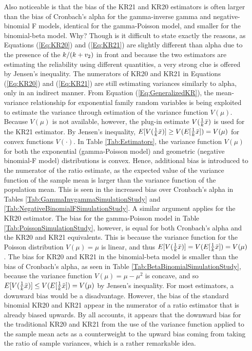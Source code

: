 \documentclass[12pt,epsfig]{article}
\newcommand{\changed}[1]{\textcolor{black}{#1}}
\newcommand{\testlength}{\changed{k}}%
\begin{document}
Also noticeable is that the bias of the KR21 and KR20 estimators is often larger than the bias of Cronbach's alpha for the gamma-inverse gamma and negative-binomial F models, identical for the gamma-Poisson model, and smaller for the binomial-beta model. Why? Though is it difficult to state exactly the reasons, as Equations (\ref{Eq:KR20}) and (\ref{Eq:KR21}) are slightly different than alpha due to the presence of the $\testlength/(\testlength + v_2)$ in front and because the two estimators are estimating the reliability using different quantities, a very strong clue is offered by Jensen's inequality. The numerators of KR20 and KR21 in Equations (\ref{Eq:KR20}) and (\ref{Eq:KR21}) are still estimating variances similarly to alpha, only in an indirect manner. From Equation (\ref{Eq:GeneralizedKR}), the mean-variance relationship for exponential family random variables is being exploited to estimate the variance through estimation of the variance function $V(\mu)$. Because $V(\mu)$ is not available, however, the plug-in estimate $V(\frac{1}{\testlength} \bar{x})$ is used for the KR21 estimator. By Jensen's inequality, $E[V(\frac{1}{\testlength} \bar{x})] \ge V(E[\frac{1}{\testlength} \bar{x}]) = V(\mu)$ for convex functions $V(\cdot)$. In Table \ref{Tab:Estimators}, the variance function $V(\mu)$ for both the exponential (gamma-Poisson model) and geometric (negative binomial-F model) distributions is convex. Hence, additional bias is introduced to the numerator of the ratio estimate, as the expected value of the variance function of the sample mean is larger than the variance function of the population mean. This is seen in the increased bias over Cronbach's alpha in Tables \ref{Tab:GammaInvgammaSimulationStudy} and \ref{Tab:NegativeBinomialFSimulationStudy}. A similar argument applies for the KR20 estimator.  The bias for the gamma-Poisson model in Table \ref{Tab:PoissonSimulationStudy}, however, is equal for both Cronbach's alpha and the KR20 and KR21 equivalents. This is because the variance function for the Poisson distribution $V(\mu) = \mu$ is linear, and thus $E[V(\frac{1}{\testlength} \bar{x})] = V(E[\frac{1}{\testlength} \bar{x}]) = V(\mu)$.  The bias for KR20 and KR21 in the binomial-beta model is smaller than the bias of Cronbach's alpha, as seen in Table \ref{Tab:BetaBinomialSimulationStudy}, because the variance function $V(\mu) = \mu - \mu^2$ is concave, and so $E[V(\frac{1}{\testlength} \bar{x})] \le V(E[\frac{1}{\testlength} \bar{x}]) = V(\mu)$ by Jensen's inequality. For most estimators, a downward bias would be a disadvantage. However, the bias of  the standard binomial KR20 and KR21 appear in the numerator of a ratio estimator that is already biased upwards. By all accounts, it appears that the downward bias for the traditional KR20 and KR21 from the use of the variance function applied to the sample mean acts as a counterweight to the upward bias coming from taking the ratio of sample variances, which is a rather remarkable idea.  %
\end{document}
